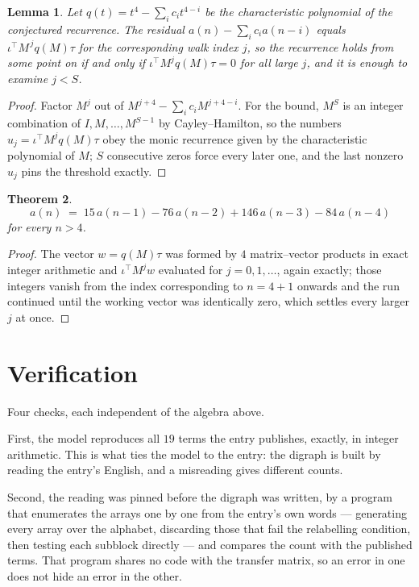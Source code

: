 \documentclass[11pt,a4paper]{article}
\theoremstyle{plain}
\newtheorem{theorem}{Theorem}
\newtheorem{lemma}[theorem]{Lemma}
\theoremstyle{definition}
\begin{document}
\begin{lemma}\label{lem:crit}
Let $q(t)=t^{4}-\sum_i c_it^{4-i}$ be the characteristic polynomial of the
conjectured recurrence. The residual $a(n)-\sum_ic_ia(n-i)$ equals
$\iota^{\!\top}M^{\,j}q(M)\tau$ for the corresponding walk index $j$, so the recurrence
holds from some point on if and only if $\iota^{\!\top}M^{j}q(M)\tau=0$ for all large $j$,
and it is enough to examine $j<S$.
\end{lemma}

\begin{proof}
Factor $M^{j}$ out of $M^{j+4}-\sum_ic_iM^{j+4-i}$. For the bound, $M^{S}$
is an integer combination of $I,M,\dots,M^{S-1}$ by Cayley--Hamilton, so the numbers
$u_j=\iota^{\!\top}M^{j}q(M)\tau$ obey the monic recurrence given by the characteristic
polynomial of $M$; $S$ consecutive zeros force every later one, and the last nonzero $u_j$
pins the threshold exactly.
\end{proof}

\begin{theorem}
\[
a(n)\;=\;15\,a(n-1) - 76\,a(n-2) + 146\,a(n-3) - 84\,a(n-4)
\]
for every $n>4$.
\end{theorem}

\begin{proof}
The vector $w=q(M)\tau$ was formed by $4$ matrix--vector products in exact integer
arithmetic and $\iota^{\!\top}M^{j}w$ evaluated for $j=0,1,\dots$, again exactly; those
integers vanish from the index corresponding to $n=4+1$ onwards and the run continued
until the working vector was identically zero, which settles every larger $j$ at once.
\end{proof}

\section{Verification}

Four checks, each independent of the algebra above.

First, the model reproduces all $19$ terms the entry publishes, exactly, in integer
arithmetic. This is what ties the model to the entry: the digraph is built by reading the
entry's English, and a misreading gives different counts.

Second, the reading was pinned before the digraph was written, by a program that enumerates
the arrays one by one from the entry's own words --- generating every array over the
alphabet, discarding those that fail the relabelling condition, then testing each subblock
directly --- and compares the count with the published terms. That program shares no code
with the transfer matrix, so an error in one does not hide an error in the other.
\end{document}
